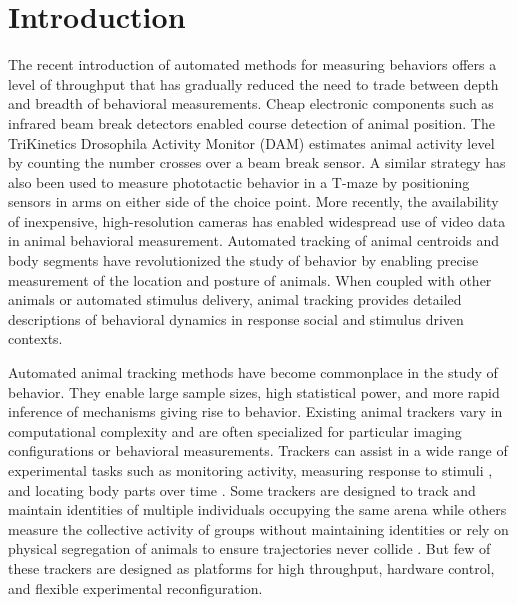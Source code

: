 \documentclass[12pt,letterpaper]{article}
\begin{document}
\linenumbers

\section*{Introduction}

The recent introduction of automated methods for measuring behaviors offers a level of throughput that has gradually reduced the need to trade between depth and breadth of behavioral measurements. Cheap electronic components such as infrared beam break detectors enabled course detection of animal position. The TriKinetics Drosophila Activity Monitor (DAM) estimates animal activity level by counting the number crosses over a beam break sensor. A similar strategy has also been used to measure phototactic behavior in a T-maze by positioning sensors in arms on either side of the choice point. More recently, the availability of inexpensive, high-resolution cameras has enabled widespread use of video data in animal behavioral measurement. Automated tracking of animal centroids and body segments have revolutionized the study of behavior by enabling precise measurement of the location and posture of animals. When coupled with other animals or automated stimulus delivery, animal tracking provides detailed descriptions of behavioral dynamics in response social and stimulus driven contexts. 

Automated animal tracking methods have become commonplace in the study of behavior. They enable large sample sizes, high statistical power, and more rapid inference of mechanisms giving rise to behavior. Existing animal trackers vary in computational complexity and are often specialized for particular imaging configurations or behavioral measurements. Trackers can assist in a wide range of experimental tasks such as monitoring activity, measuring response to stimuli \cite{Fry_TrackFly_2008,Donelson_High_2012}, and locating body parts over time \cite{Mathis_DeepLabCut_2018,Pereira_Fast_2018}. Some trackers are designed to track and maintain identities of multiple individuals occupying the same arena \cite{Prez-Escudero_idTracker_2014,Eyjolfsdottir_Detecting_2014,Rodriguez_ToxId_2017,romero-ferrero_2019} while others measure the collective activity of groups without maintaining identities or rely on physical segregation of animals to ensure trajectories never collide \cite{Ramot_The_2008,Swierczek_High_2011,Itskovits_A_2017,Scaplen_Automated_2019}. But few of these trackers are designed as platforms for high throughput, hardware control, and flexible experimental reconfiguration. 
\end{document}
